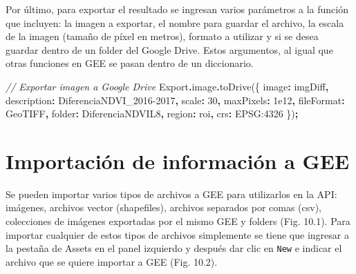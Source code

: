 \documentclass[
  12pt,
  letterpaper,
  twoside]{book}
\newenvironment{Shaded}{\begin{snugshade}}{\end{snugshade}}
\newcommand{\AttributeTok}[1]{\textcolor[rgb]{0.77,0.63,0.00}{#1}}
\newcommand{\CommentTok}[1]{\textcolor[rgb]{0.56,0.35,0.01}{\textit{#1}}}
\newcommand{\DataTypeTok}[1]{\textcolor[rgb]{0.13,0.29,0.53}{#1}}
\newcommand{\DecValTok}[1]{\textcolor[rgb]{0.00,0.00,0.81}{#1}}
\newcommand{\FloatTok}[1]{\textcolor[rgb]{0.00,0.00,0.81}{#1}}
\newcommand{\FunctionTok}[1]{\textcolor[rgb]{0.00,0.00,0.00}{#1}}
\newcommand{\NormalTok}[1]{#1}
\newcommand{\OperatorTok}[1]{\textcolor[rgb]{0.81,0.36,0.00}{\textbf{#1}}}
\newcommand{\StringTok}[1]{\textcolor[rgb]{0.31,0.60,0.02}{#1}}
\begin{document}
Por último, para exportar el resultado se ingresan varios parámetros a la función que incluyen: la imagen a exportar, el nombre para guardar el archivo, la escala de la imagen (tamaño de píxel en metros), formato a utilizar y si se desea guardar dentro de un folder del Google Drive. Estos argumentos, al igual que otras funciones en GEE se pasan dentro de un diccionario.

\begin{Shaded}
\begin{Highlighting}[]
\CommentTok{// Exportar imagen a Google Drive}
\NormalTok{Export}\OperatorTok{.}\AttributeTok{image}\OperatorTok{.}\FunctionTok{toDrive}\NormalTok{(\{}
  \DataTypeTok{image}\OperatorTok{:}\NormalTok{ imgDiff}\OperatorTok{,}
  \DataTypeTok{description}\OperatorTok{:} \StringTok{\textquotesingle{}DiferenciaNDVI\_2016{-}2017\textquotesingle{}}\OperatorTok{,}
  \DataTypeTok{scale}\OperatorTok{:} \DecValTok{30}\OperatorTok{,}
  \DataTypeTok{maxPixels}\OperatorTok{:} \FloatTok{1e12}\OperatorTok{,}
  \DataTypeTok{fileFormat}\OperatorTok{:} \StringTok{\textquotesingle{}GeoTIFF\textquotesingle{}}\OperatorTok{,}
  \DataTypeTok{folder}\OperatorTok{:} \StringTok{\textquotesingle{}DiferenciaNDVIL8\textquotesingle{}}\OperatorTok{,}
  \DataTypeTok{region}\OperatorTok{:}\NormalTok{ roi}\OperatorTok{,}
  \DataTypeTok{crs}\OperatorTok{:} \StringTok{\textquotesingle{}EPSG:4326}
\NormalTok{\})}\OperatorTok{;} 
\end{Highlighting}
\end{Shaded}

\newpage

\hypertarget{importaciuxf3n-de-informaciuxf3n-a-gee}{%
\chapter{Importación de información a GEE}\label{importaciuxf3n-de-informaciuxf3n-a-gee}}

Se pueden importar varios tipos de archivos a GEE para utilizarlos en la API: imágenes, archivos vector (shapefiles), archivos separados por comas (csv), colecciones de imágenes exportadas por el mismo GEE y folders (Fig. 10.1). Para importar cualquier de estos tipos de archivos simplemente se tiene que ingresar a la pestaña de Assets en el panel izquierdo y después dar clic en \texttt{New} e indicar el archivo que se quiere importar a GEE (Fig. 10.2).
\end{document}
